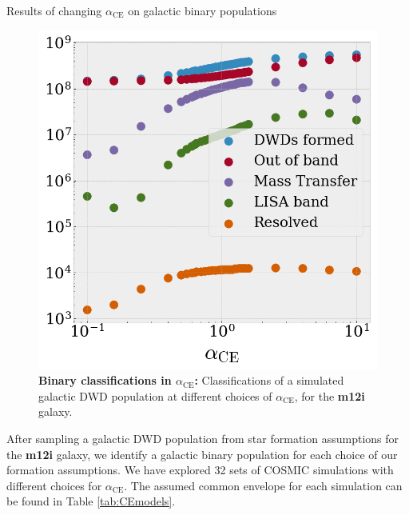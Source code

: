 \documentclass[twocolumn]{aastex631}
\newcommand*{\alphaCE}{\alpha_{\mathrm{CE}}}
\begin{document}
\begin{subsection}{Results of changing $\alphaCE{}$ on galactic binary populations}
\label{sec:1d}

\begin{figure}
\centering
\includegraphics[width=3.375 in]{m12i_Numbers.png}
\caption{\label{fig:m12i_Numbers}
    \textbf{Binary classifications in $\alphaCE{} $:}
Classifications of a simulated galactic DWD population at
    different choices of $\alphaCE{}$, for the \textbf{m12i} galaxy.
}
\end{figure}

After sampling a galactic DWD population from
    star formation assumptions for the \textbf{m12i} galaxy,
    we identify a galactic binary population for each choice of 
    our formation assumptions.
We have explored 32 sets of COSMIC simulations with different choices
    for $\alphaCE$.
The assumed common envelope for each simulation can be found in Table \ref{tab:CEmodels}.


\end{subsection}
\end{document}
